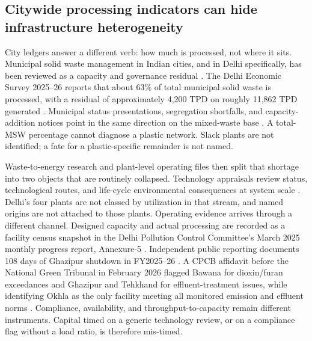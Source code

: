 \documentclass[12pt,a4paper]{article}
\begin{document}
\subsection{Citywide processing indicators can hide infrastructure heterogeneity}

City ledgers answer a different verb: how much is processed, not where it sits. Municipal solid waste management in Indian cities, and in Delhi specifically, has been reviewed as a capacity and governance residual \citep{sharholy_india_2008,talyan_delhi_2008}. The Delhi Economic Survey 2025--26 reports that about 63\% of total municipal solid waste is processed, with a residual of approximately 4,200 TPD on roughly 11,862 TPD generated \citep{delhi_eco_survey_2026,ht_delhi_63pct_2026,millennium_post_63pct_2026}. Municipal status presentations, segregation shortfalls, and capacity-addition notices point in the same direction on the mixed-waste base \citep{mcd_swm_ppt,toi_segregation_roadmap_2026,nie_segregation_failed_2026,nie_mcd_four_plants_2025,toi_tehkhand_expansion_2026,bioenergytimes_capacity_2026,et_mpd2047_2026,nie_processing_gap_2026}. A total-MSW percentage cannot diagnose a plastic network. Slack plants are not identified; a fate for a plastic-specific remainder is not named.

Waste-to-energy research and plant-level operating files then split that shortage into two objects that are routinely collapsed. Technology appraisals review status, technological routes, and life-cycle environmental consequences at system scale \citep{sciencedirect_wte_india_review_2014,springer_msw_wte_india_overview_2017,sciencedirect_msw_energy_techno_2020,astrup_wte_2015}. Delhi's four plants are not classed by utilization in that stream, and named origins are not attached to those plants. Operating evidence arrives through a different channel. Designed capacity and actual processing are recorded as a facility census snapshot in the Delhi Pollution Control Committee's March 2025 monthly progress report, Annexure-5 \citep{dpcc_mpr_2025}. Independent public reporting documents 108 days of Ghazipur shutdown in FY2025--26 \citep{ht_ghazipur_shutdown_2026}. A CPCB affidavit before the National Green Tribunal in February 2026 flagged Bawana for dioxin/furan exceedances and Ghazipur and Tehkhand for effluent-treatment issues, while identifying Okhla as the only facility meeting all monitored emission and effluent norms \citep{ht_cpcb_affidavit_2026}. Compliance, availability, and throughput-to-capacity remain different instruments. Capital timed on a generic technology review, or on a compliance flag without a load ratio, is therefore mis-timed.
\end{document}
